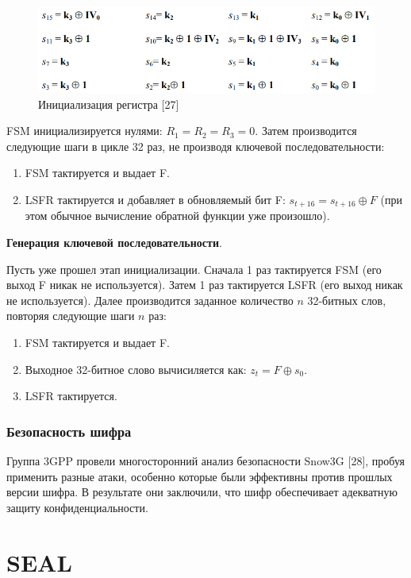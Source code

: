 \documentclass[colorthm]{./civarticle}
\begin{document}
\begin{figure}[H]
    \centering
    \includegraphics[width=0.75\linewidth]{Снимок экрана 2024-01-12 144510.png}
    \caption{Инициализация регистра [27]}
    \label{fig:enter-label}
\end{figure}

FSM инициализируется нулями: $R_1 = R_2 = R_3 = 0$. Затем производится следующие шаги в цикле 32 раз, не производя ключевой последовательности:

\begin{enumerate}
    \item FSM тактируется и выдает F.
    \item LSFR тактируется и добавляет в обновляемый бит F: $s_{t+16} = s_{t+16} \oplus F$ (при этом обычное вычисление обратной функции уже произошло).
\end{enumerate}

\textbf{Генерация ключевой последовательности}.

Пусть уже прошел этап инициализации. Сначала 1 раз тактируется FSM (его выход F никак не используется). Затем 1 раз тактируется LSFR (его выход никак не используется). Далее производится заданное количество $n$ 32-битных слов, повторяя следующие шаги $n$ раз: 

\begin{enumerate}
    \item FSM тактируется и выдает F.
    \item Выходное 32-битное слово вычисиляется как: $z_t = F \oplus s_0$.
    \item LSFR тактируется.
\end{enumerate}

\subsubsection{Безопасность шифра} 

Группа 3GPP провели многосторонний анализ безопасности Snow3G [28], пробуя применить разные атаки, особенно которые были эффективны против прошлых версии шифра. В результате они заключили, что шифр обеспечивает адекватную защиту конфиденциальности.

\section{SEAL}
\end{document}
